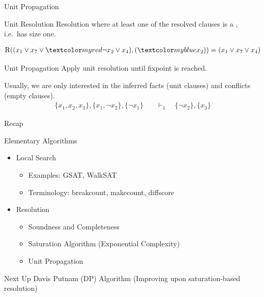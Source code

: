 \documentclass[t]{sdqbeamer}
\begin{document}
\begin{frame}{Unit Propagation}
\begin{block}{Unit Resolution}
Resolution where at least one of the resolved clauses is a , i.e.~has size one.
\end{block}
\begin{example}
\vspace*{-3ex}
\begin{align*}
	\operatorname{R}((x_1 \vee x_7 \vee \highlo{\lnot {x_2}} \vee x_4), (\highl{x_2})) = (x_1 \vee x_7 \vee x_4)
\end{align*}
\end{example}
\pause
\begin{block}{Unit Propagation}
Apply unit resolution until fixpoint is reached.
\end{block}
\begin{example}
Usually, we are only interested in the inferred facts (unit clauses) and conflicts (empty clauses).
\vspace*{-1ex}
\begin{align*}
	\{ x_1, x_2, x_3 \}, \{ x_1, \lnot x_2 \}, \{ \lnot x_1 \} \quad &\vdash_1 \quad \{ \lnot x_2 \}, \{ x_3 \}
\end{align*}
\end{example}
\end{frame}

\begin{frame}{Recap}
	\begin{block}{Elementary Algorithms}
		\begin{itemize}\setlength{\itemsep}{1ex}
			\item Local Search
			\begin{itemize}
				\item Examples: GSAT, WalkSAT
				\item Terminology: breakcount, makecount, diffscore
			\end{itemize}
			\item Resolution
			\begin{itemize}
				\item Soundness and Completeness
				\item Saturation Algorithm (Exponential Complexity)
				\item Unit Propagation
			\end{itemize}
		\end{itemize}
	\end{block}
	\pause
	\begin{block}{Next Up}
		Davis Putnam (DP) Algorithm (Improving upon saturation-based resolution)
	\end{block}
\end{frame}
\end{document}
